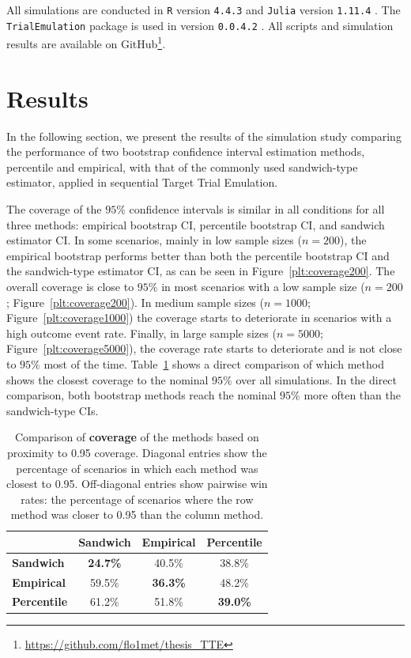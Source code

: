 \documentclass[pdflatex,sn-vancouver-ay]{sn-jnl}%
\theoremstyle{thmstyleone}%
\theoremstyle{thmstyletwo}%
\theoremstyle{thmstylethree}%
\newcommand{\Rlang}{\texttt{R}}
\newcommand{\julia}{\texttt{Julia}}
\newcommand{\RTTE}{\texttt{TrialEmulation}}
\begin{document}
All simulations are conducted in \Rlang{} version \texttt{4.4.3} \citep{R_cite} and \julia{} version \texttt{1.11.4} \citep{bezansonJuliaFreshApproach2017}. The \RTTE{} package is used in version \texttt{0.0.4.2} \citep{suTrialEmulationPackageEmulate2024}. All scripts and simulation results are available on GitHub\footnote{\url{https://github.com/flo1met/thesis_TTE}}.


\section{Results}\label{sec:Results}
In the following section, we present the results of the simulation study comparing the performance of two bootstrap confidence interval estimation methods, percentile and empirical, with that of the commonly used sandwich-type estimator, applied in sequential Target Trial Emulation.

The coverage of the $95\%$ confidence intervals is similar in all conditions for all three methods: empirical bootstrap CI, percentile bootstrap CI, and sandwich estimator CI. In some scenarios, mainly in low sample sizes ($n = 200$), the empirical bootstrap performs better than both the percentile bootstrap CI and the sandwich-type estimator CI, as can be seen in Figure~\ref{plt:coverage200}. The overall coverage is close to $95\%$ in most scenarios with a low sample size ($n = 200$; Figure~\ref{plt:coverage200}). In medium sample sizes ($n = 1000$; Figure~\ref{plt:coverage1000}) the coverage starts to deteriorate in scenarios with a high outcome event rate. Finally, in large sample sizes ($n = 5000$; Figure~\ref{plt:coverage5000}), the coverage rate starts to deteriorate and is not close to $95\%$ most of the time. Table~\ref{tab:coverage_comparison} shows a direct comparison of which method shows the closest coverage to the nominal $95\%$ over all simulations. In the direct comparison, both bootstrap methods reach the nominal $95\%$ more often than the sandwich-type CIs.

\begin{table}[h!]
\centering
\begin{tabular}{lccc}
\hline
\textbf{} & \textbf{Sandwich} & \textbf{Empirical} & \textbf{Percentile} \\
\hline
\textbf{Sandwich}   & \textbf{24.7\%} & 40.5\% & 38.8\% \\
\textbf{Empirical}  & 59.5\%          & \textbf{36.3\%} & 48.2\% \\
\textbf{Percentile} & 61.2\%          & 51.8\% & \textbf{39.0\%} \\
\hline
\end{tabular}
\caption{Comparison of \textbf{coverage} of the methods based on proximity to 0.95 coverage. Diagonal entries show the percentage of scenarios in which each method was closest to 0.95. Off-diagonal entries show pairwise win rates: the percentage of scenarios where the row method was closer to 0.95 than the column method.}
\label{tab:coverage_comparison}
\end{table}
\end{document}
